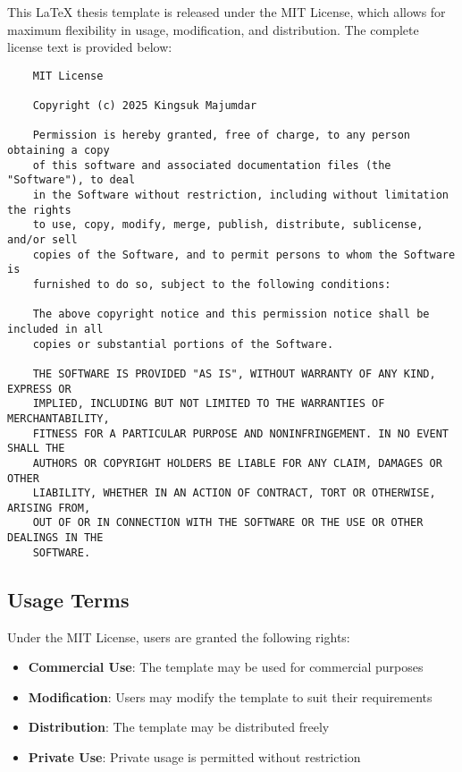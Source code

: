 This LaTeX thesis template is released under the MIT License, which allows for maximum flexibility in usage, modification, and distribution. The complete license text is provided below:

\begin{verbatim}
	MIT License
	
	Copyright (c) 2025 Kingsuk Majumdar
	
	Permission is hereby granted, free of charge, to any person obtaining a copy
	of this software and associated documentation files (the "Software"), to deal
	in the Software without restriction, including without limitation the rights
	to use, copy, modify, merge, publish, distribute, sublicense, and/or sell
	copies of the Software, and to permit persons to whom the Software is
	furnished to do so, subject to the following conditions:
	
	The above copyright notice and this permission notice shall be included in all
	copies or substantial portions of the Software.
	
	THE SOFTWARE IS PROVIDED "AS IS", WITHOUT WARRANTY OF ANY KIND, EXPRESS OR
	IMPLIED, INCLUDING BUT NOT LIMITED TO THE WARRANTIES OF MERCHANTABILITY,
	FITNESS FOR A PARTICULAR PURPOSE AND NONINFRINGEMENT. IN NO EVENT SHALL THE
	AUTHORS OR COPYRIGHT HOLDERS BE LIABLE FOR ANY CLAIM, DAMAGES OR OTHER
	LIABILITY, WHETHER IN AN ACTION OF CONTRACT, TORT OR OTHERWISE, ARISING FROM,
	OUT OF OR IN CONNECTION WITH THE SOFTWARE OR THE USE OR OTHER DEALINGS IN THE
	SOFTWARE.
\end{verbatim}

\subsection{Usage Terms}
\label{subsec:usage_terms}

Under the MIT License, users are granted the following rights:

\begin{itemize}
	\item \textbf{Commercial Use}: The template may be used for commercial purposes
	\item \textbf{Modification}: Users may modify the template to suit their requirements
	\item \textbf{Distribution}: The template may be distributed freely
	\item \textbf{Private Use}: Private usage is permitted without restriction
\end{itemize}

